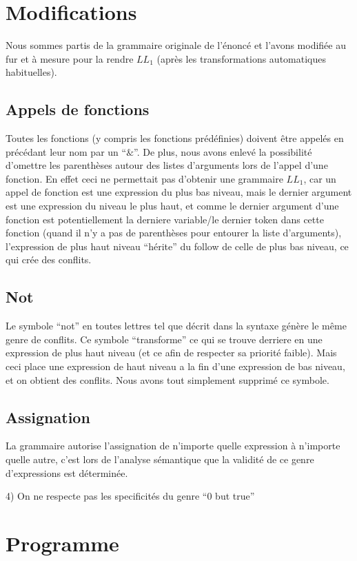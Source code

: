 \documentclass[a4paper,10pt]{article}
\begin{document}
\section{Modifications}

	Nous sommes partis de la grammaire originale de l'énoncé et l'avons
	modifiée au fur et à mesure pour la rendre $LL_1$ (après les transformations
	automatiques habituelles).

	\subsection{Appels de fonctions}
		Toutes les fonctions (y compris les fonctions prédéfinies) doivent être
		appelés en précédant leur nom par un ``$\&$''. De plus, nous avons enlevé la
		possibilité d'omettre les parenthèses autour des listes	d'arguments lors de
		l'appel d'une fonction. En effet ceci ne permettait pas d'obtenir une
		grammaire $LL_1$, car un appel de fonction est une expression du plus bas
		niveau, mais le dernier argument est une expression du niveau le plus haut, et
		comme le dernier argument d'une fonction est potentiellement la derniere
		variable/le dernier token dans cette fonction (quand il n'y a pas de
		parenthèses pour entourer la liste d'arguments), l'expression de plus haut
		niveau ``hérite'' du follow de celle de plus bas niveau, ce qui crée des
		conflits.
	
	\subsection{Not}
		Le symbole ``not'' en toutes lettres tel que décrit dans la syntaxe génère le
		même genre de conflits. Ce symbole ``transforme'' ce qui se trouve derriere en
		une expression de plus haut niveau (et ce afin de respecter sa priorité
		faible). Mais ceci place une expression de haut niveau a la fin d'une
		expression de bas niveau, et on obtient des conflits. Nous avons tout
		simplement supprimé ce symbole.
		
	\subsection{Assignation} 
		La grammaire autorise l'assignation de n'importe quelle
		expression à n'importe quelle autre, c'est lors de l'analyse sémantique
		que la validité de ce genre d'expressions est déterminée.

4) On ne respecte pas les specificités du genre ``0 but true''

\section{Programme}
\end{document}
